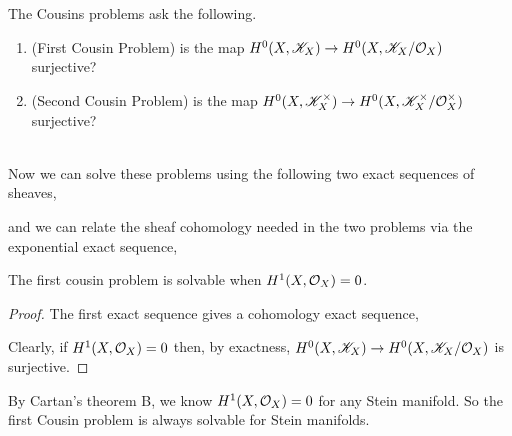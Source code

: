 \documentclass[12pt]{article}
\begin{document}
\begin{defn}
The Cousins problems ask the following. 
\begin{enumerate}
\item (First Cousin Problem) is the map $H^0(X, \mathscr{K}_X) \to H^0(X, \mathscr{K}_X / \mathcal{O}_{X})$ surjective?
\item (Second Cousin Problem) is the map $H^0(X, \mathscr{K}_X^\times) \to H^0(X, \mathscr{K}_X^\times / \mathcal{O}_{X}^\times)$ surjective?
\end{enumerate}
\end{defn}
\noindent\\
Now we can solve these problems using the following two exact sequences of sheaves,
\begin{center}
\end{center}
and we can relate the sheaf cohomology needed in the two problems via the exponential exact sequence,
\begin{center}
\end{center}

\begin{theorem}
The first cousin problem is solvable when $H^1(X, \mathcal{O}_{X}) = 0$. 
\end{theorem}

\begin{proof}
The first exact sequence gives a cohomology exact sequence,
\begin{center}
\end{center}
Clearly, if $H^1(X, \mathcal{O}_{X}) = 0$ then, by exactness, $H^0(X, \mathscr{K}_X) \to H^0(X, \mathscr{K}_X / \mathcal{O}_{X})$ is surjective. 
\end{proof}

\begin{rmk}
By Cartan's theorem B, we know $H^1(X, \mathcal{O}_{X}) = 0$ for any Stein manifold. So the first Cousin problem is always solvable for Stein manifolds.
\end{rmk}
\end{document}
